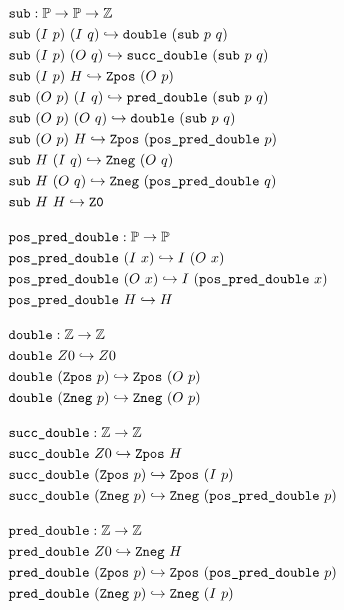 \begin{definition}
\begin{align*}
& \kw{sub} : \bb{P} \ra \bb{P} \ra \bb{Z} \\
& \kw{sub}~(I~p)~(I~q) \re \kw{double}~(\kw{sub}~p~q) \\
& \kw{sub}~(I~p)~(O~q) \re \kw{succ\_double}~(\kw{sub}~p~q) \\
& \kw{sub}~(I~p)~H \re \kw{Zpos}~(O~p) \\
& \kw{sub}~(O~p)~(I~q) \re \kw{pred\_double}~(\kw{sub}~p~q) \\
& \kw{sub}~(O~p)~(O~q) \re \kw{double}~(\kw{sub}~p~q) \\
& \kw{sub}~(O~p)~H \re \kw{Zpos}~(\kw{pos\_pred\_double}~p) \\
& \kw{sub}~H~(I~q) \re \kw{Zneg}~(O~q) \\
& \kw{sub}~H~(O~q) \re \kw{Zneg}~(\kw{pos\_pred\_double}~q) \\
& \kw{sub}~H~H \re \kw{Z0} \\[1em]
%
& \kw{pos\_pred\_double} : \bb{P} \ra \bb{P} \\
& \kw{pos\_pred\_double}~(I~x) \re I~(O~x) \\
& \kw{pos\_pred\_double}~(O~x) \re I~(\kw{pos\_pred\_double}~x) \\
& \kw{pos\_pred\_double}~H \re H \\[1em]
%
& \kw{double} : \bb{Z} \ra \bb{Z} \\
& \kw{double}~Z0 \re Z0 \\
& \kw{double}~(\kw{Zpos}~p) \re \kw{Zpos}~(O~p) \\
& \kw{double}~(\kw{Zneg}~p) \re \kw{Zneg}~(O~p) \\[1em]
%
& \kw{succ\_double} : \bb{Z} \ra \bb{Z} \\
& \kw{succ\_double}~Z0 \re \kw{Zpos}~H \\
& \kw{succ\_double}~(\kw{Zpos}~p) \re \kw{Zpos}~(I~p) \\
& \kw{succ\_double}~(\kw{Zneg}~p) \re \kw{Zneg}~(\kw{pos\_pred\_double}~p) \\[1em]
%
& \kw{pred\_double} : \bb{Z} \ra \bb{Z} \\
& \kw{pred\_double}~Z0 \re \kw{Zneg}~H \\
& \kw{pred\_double}~(\kw{Zpos}~p) \re \kw{Zpos}~(\kw{pos\_pred\_double}~p) \\
& \kw{pred\_double}~(\kw{Zneg}~p) \re \kw{Zneg}~(I~p)
\end{align*}
\end{definition}

